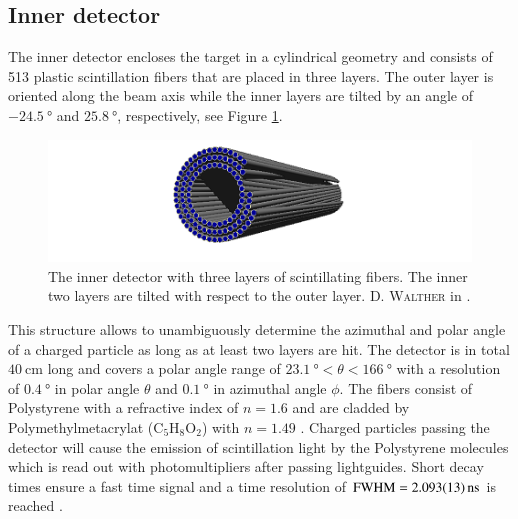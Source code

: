 \subsection{Inner detector}
\label{sec:in}
The inner detector \cite{indet,suft} encloses the target in a cylindrical geometry and consists of 513 plastic scintillation fibers that are placed in three layers. The outer layer is oriented along the beam axis while the inner layers are tilted by an angle of $\SI{-24.5}{\degree}$ and $\SI{25.8}{\degree}$, respectively, see Figure \ref{fig:indet}.
\begin{figure}[htbp]
	\centering
	\includegraphics[width=\linewidth]{figs/indet.pdf}
	\caption{The inner detector with three layers of scintillating fibers. The inner two layers are tilted with respect to the outer layer. \textsc{D. Walther} in \cite{farahphd}.}
	\label{fig:indet}
\end{figure}
This structure allows to unambiguously determine the azimuthal and polar angle of a charged particle as long as at least two layers are hit. The detector is in total $\SI{40}{\centi\meter}$ long and covers a polar angle range of $\SI{23.1}{\degree}<\theta<\SI{166}{\degree}$ with a resolution of $\SI{0.4}{\degree}$ in polar angle $\theta$ and $\SI{0.1}{\degree}$ in azimuthal angle $\phi$. The fibers consist of Polystyrene with a refractive index of $n=1.6$ and are cladded by Polymethylmetacrylat ($\text{C}_5\text{H}_8\text{O}_2$) with $n=1.49$ \cite{prop}. Charged particles passing the detector will cause the emission of scintillation light by the Polystyrene molecules which is read out with photomultipliers after passing lightguides. Short decay times ensure a fast time signal and a time resolution of $\text{FWHM}=\SI{2.093\pm0.013}{\nano\s}$ is reached \cite{hartmanndipl}.
